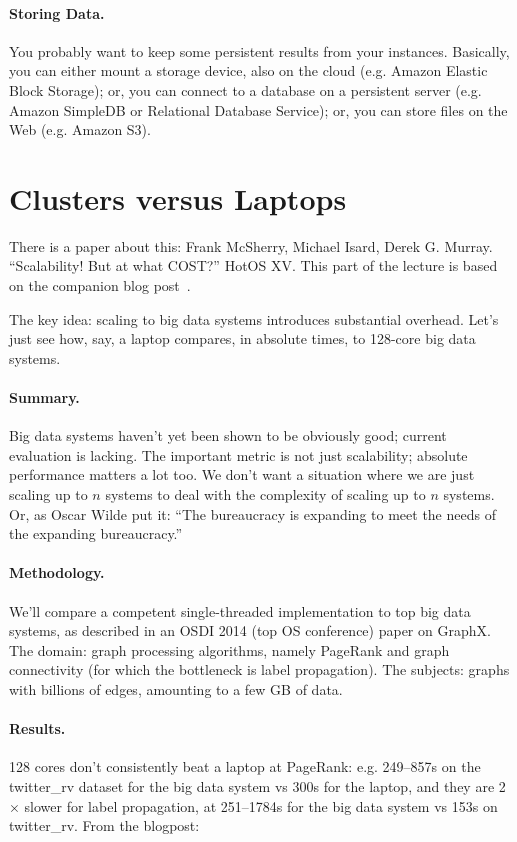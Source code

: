 \documentclass[a4paper]{report}
\begin{document}
\paragraph{Storing Data.} You probably want to keep some persistent results
from your instances. Basically, you can either mount a storage device,
also on the cloud (e.g. Amazon Elastic Block Storage); or, you can
connect to a database on a persistent server (e.g. Amazon SimpleDB or
Relational Database Service); or, you can store files on the Web
(e.g. Amazon S3). 


\section*{Clusters versus Laptops}
There is a paper about this: Frank McSherry, Michael Isard, Derek G. Murray. ``Scalability! But at what COST?'' HotOS XV. This part of the lecture is based on the companion blog post~\cite{scalecost}.

The key idea: scaling to big data systems introduces substantial overhead. Let's just see how, say, a laptop compares, in absolute times, to 128-core big data systems.

\paragraph{Summary.} Big data systems haven't yet been shown to be obviously good; current evaluation is lacking.
The important metric is not just scalability; absolute
performance matters a lot too. We don't want a situation where we are just scaling up to $n$ systems to deal with the complexity of scaling up to $n$ systems. Or, as Oscar Wilde put it: ``The bureaucracy is expanding to meet the needs of the expanding bureaucracy.''

\paragraph{Methodology.} We'll compare a competent single-threaded implementation to top
big data systems, as described in an OSDI 2014 (top OS conference) paper on GraphX\cite{graphx}. The domain: graph processing
algorithms, namely PageRank and graph connectivity (for which the bottleneck is label propagation). The subjects: graphs with billions of edges, amounting to a few
GB of data.

\paragraph{Results.} 128 cores don't consistently beat a laptop at PageRank: e.g. 249--857s on the twitter\_rv dataset for the big data system vs 300s for the laptop, and they are 2$\times$ slower for label
propagation, at 251--1784s for the big data system vs 153s on
twitter\_rv. From the blogpost:
\end{document}
